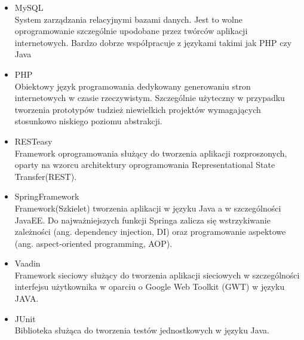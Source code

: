 \documentclass[11pt,a4paper,polish,thesis]{dcsbook}
\begin{document}
\begin{itemize}
\item{MySQL} \\
System zarządzania relacyjnymi bazami danych. Jest to wolne oprogramowanie szczególnie upodobane przez twórców aplikacji internetowych. Bardzo dobrze współpracuje z językami takimi jak PHP czy Java
\item{PHP} \\
Obiektowy język programowania dedykowany generowaniu stron internetowych w czasie rzeczywistym. Szczególnie użyteczny w przypadku tworzenia prototypów tudzież niewielkich projektów wymagających stosunkowo niskiego poziomu abstrakcji.
\item{RESTeasy} \\
Framework oprogramowania służący do tworzenia aplikacji rozproszonych, oparty na wzorcu architektury oprogramowania Representational State Transfer(REST).
\item{SpringFramework} \\
Framework(Szkielet) tworzenia aplikacji w języku Java a w szczególności JavaEE. Do najważniejszych funkcji Springa zalicza się wstrzykiwanie zależności (ang. dependency injection, DI) oraz programowanie aspektowe (ang. aspect-oriented programming, AOP).  
\item{Vaadin} \\
Framework sieciowy służący do tworzenia aplikacji sieciowych w szczególności interfejsu użytkownika w oparciu o Google Web Toolkit (GWT) w języku JAVA.
\item{JUnit} \\
Biblioteka służąca do tworzenia testów jednostkowych w języku Java.
\end{itemize}
\end{document}
